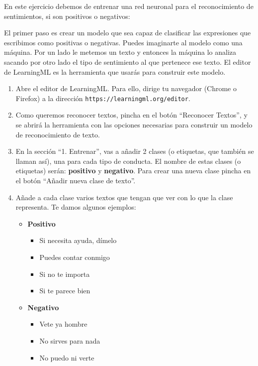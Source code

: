 En este ejercicio debemos de entrenar una red neuronal para el reconocimiento de sentimientos, si son positivos o negativos:

El primer paso es crear un modelo que sea capaz de clasificar las expresiones que escribimos como positivas o negativas. Puedes imaginarte al modelo como una máquina. Por un lado le metemos un texto y entonces la máquina lo analiza sacando por otro lado el tipo de sentimiento al que pertenece ese texto. El editor de LearningML es la herramienta que usarás para construir este modelo.

\begin{enumerate}
    \item Abre el editor de LearningML. Para ello, dirige tu navegador (Chrome o Firefox) a la dirección \texttt{https://learningml.org/editor}.
    \item Como queremos reconocer textos, pincha en el botón ``Reconocer Textos'', y se abrirá la herramienta con las opciones necesarias para construir un modelo de reconocimiento de texto.
    \item En la sección ``1. Entrenar'', vas a añadir 2 clases (o etiquetas, que también se llaman así), una para cada tipo de conducta. El nombre de estas clases (o etiquetas) serán: \textbf{positivo} y \textbf{negativo}. Para crear una nueva clase pincha en el botón ``Añadir nueva clase de texto''.
    \item Añade a cada clase varios textos que tengan que ver con lo que la clase representa. Te damos algunos ejemplos:

    \begin{itemize}
        \item \textbf{Positivo}
        \begin{itemize}
            \item Si necesita ayuda, dímelo
            \item Puedes contar conmigo
            \item Si no te importa
            \item Si te parece bien
        \end{itemize}
        \item \textbf{Negativo}
        \begin{itemize}
            \item Vete ya hombre
            \item No sirves para nada
            \item No puedo ni verte
        \end{itemize}
    \end{itemize}


\end{enumerate}

